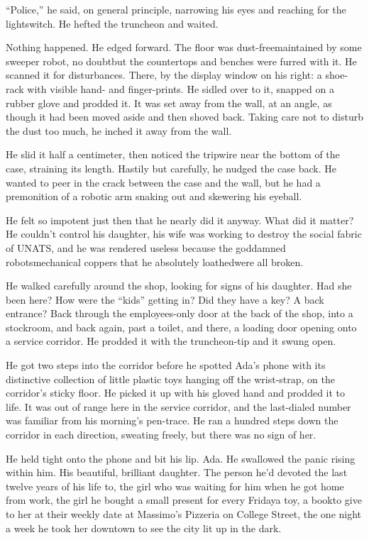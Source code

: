 “Police,” he said, on general principle, narrowing his eyes and
reaching for the lightswitch. He hefted the truncheon and waited.

Nothing happened. He edged forward. The floor was
dust-free{\dash}maintained by some sweeper robot, no doubt{\dash}but the
countertops and benches were furred with it. He scanned it for
disturbances. There, by the display window on his right: a
shoe-rack with visible hand- and finger-prints. He sidled over to
it, snapped on a rubber glove and prodded it. It was set away from
the wall, at an angle, as though it had been moved aside and then
shoved back. Taking care not to disturb the dust too much, he
inched it away from the wall.

He slid it half a centimeter, then noticed the tripwire near the
bottom of the case, straining its length. Hastily but carefully, he
nudged the case back. He wanted to peer in the crack between the
case and the wall, but he had a premonition of a robotic arm
snaking out and skewering his eyeball.

He felt so impotent just then that he nearly did it anyway. What
did it matter? He couldn’t control his daughter, his wife was
working to destroy the social fabric of UNATS, and he was rendered
useless because the goddamned robots{\dash}mechanical coppers that he
absolutely loathed{\dash}were all broken.

He walked carefully around the shop, looking for signs of his
daughter. Had she been here? How were the “kids” getting in? Did
they have a key? A back entrance? Back through the employees-only
door at the back of the shop, into a stockroom, and back again,
past a toilet, and there, a loading door opening onto a service
corridor. He prodded it with the truncheon-tip and it swung open.

He got two steps into the corridor before he spotted Ada’s phone
with its distinctive collection of little plastic toys hanging off
the wrist-strap, on the corridor’s sticky floor. He picked it up
with his gloved hand and prodded it to life. It was out of range
here in the service corridor, and the last-dialed number was
familiar from his morning’s pen-trace. He ran a hundred steps down
the corridor in each direction, sweating freely, but there was no
sign of her.

He held tight onto the phone and bit his lip. Ada. He swallowed the
panic rising within him. His beautiful, brilliant daughter. The
person he’d devoted the last twelve years of his life to, the girl
who was waiting for him when he got home from work, the girl he
bought a small present for every Friday{\dash}a toy, a book{\dash}to give to
her at their weekly date at Massimo’s Pizzeria on College Street,
the one night a week he took her downtown to see the city lit up in
the dark.

